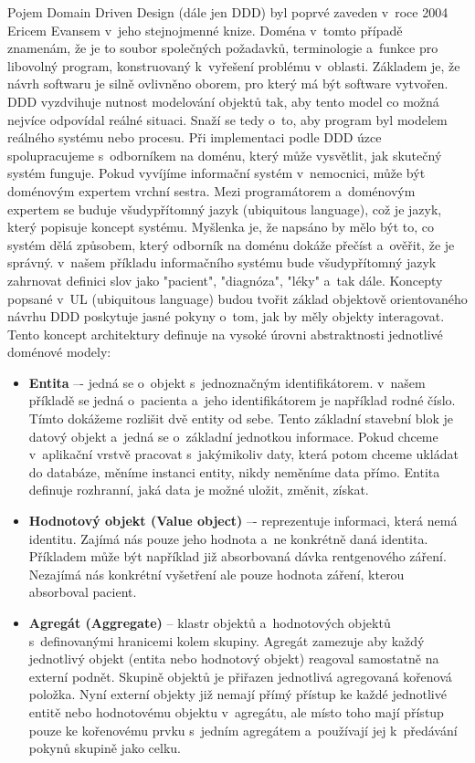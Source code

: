 
Pojem Domain Driven Design (dále jen DDD) byl poprvé zaveden v~roce 2004 Ericem Evansem v~jeho stejnojmenné knize. Doména v~tomto případě znamenám, že je to soubor společných požadavků, terminologie a~funkce pro libovolný program, konstruovaný k~vyřešení problému v~oblasti. Základem je, že návrh softwaru je silně ovlivněno oborem, pro který má být software vytvořen. DDD vyzdvihuje nutnost modelování objektů tak, aby tento model co možná nejvíce odpovídal reálné situaci. Snaží se tedy o~to, aby program byl modelem reálného systému nebo procesu. Při implementaci podle DDD úzce spolupracujeme s~odborníkem na doménu, který může vysvětlit, jak skutečný systém funguje. Pokud vyvíjíme informační systém v~nemocnici, může být doménovým expertem vrchní sestra. Mezi programátorem a~doménovým expertem se buduje všudypřítomný jazyk (ubiquitous language), což je jazyk, který popisuje koncept systému. Myšlenka je, že napsáno by mělo být to, co systém dělá způsobem, který odborník na doménu dokáže přečíst a~ověřit, že je správný. v~našem příkladu informačního systému bude všudypřítomný jazyk zahrnovat definici slov jako "pacient", "diagnóza", "léky" a~tak dále. Koncepty popsané v~UL (ubiquitous language) budou tvořit základ objektově orientovaného návrhu DDD poskytuje jasné pokyny o~tom, jak by měly objekty interagovat. Tento koncept architektury definuje na vysoké úrovni abstraktnosti jednotlivé doménové modely:\cite{19}

\begin{itemize}  
	\item \textbf{Entita} –- jedná se o~objekt s~jednoznačným identifikátorem. v~našem příkladě se jedná o~pacienta a~jeho identifikátorem je například rodné číslo. Tímto dokážeme rozlišit dvě entity od sebe. Tento základní stavební blok je datový objekt a~jedná se o~základní jednotkou informace. Pokud chceme v~aplikační vrstvě pracovat s~jakýmikoliv daty, která potom chceme ukládat do databáze, měníme instanci entity, nikdy neměníme data přímo. Entita definuje rozhranní, jaká data je možné uložit, změnit, získat.
	\item \textbf{Hodnotový objekt (Value object)} –- reprezentuje informaci, která nemá identitu. Zajímá nás pouze jeho hodnota a~ne konkrétně daná identita. Příkladem může být například již absorbovaná dávka rentgenového záření. Nezajímá nás konkrétní vyšetření ale pouze hodnota záření, kterou absorboval pacient. 
	\item \textbf{Agregát (Aggregate)} -- klastr objektů a~hodnotových objektů s~definovanými hranicemi kolem skupiny. Agregát zamezuje aby každý jednotlivý objekt (entita nebo hodnotový objekt) reagoval samostatně na externí podnět. Skupině objektů je přiřazen jednotlivá agregovaná kořenová položka. Nyní externí objekty již nemají přímý přístup ke každé jednotlivé entitě nebo hodnotovému objektu v~agregátu, ale místo toho mají přístup pouze ke kořenovému prvku s~jedním agregátem a~používají jej k~předávání pokynů skupině jako celku.
\end{itemize}

